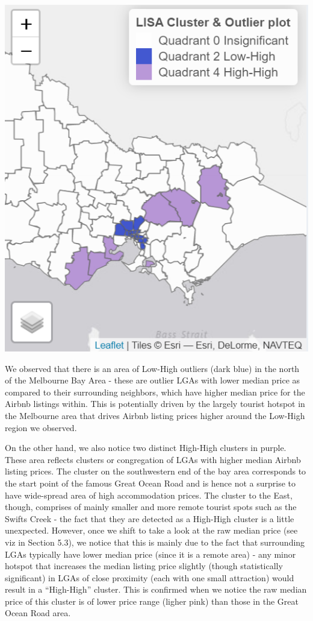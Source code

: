 \documentclass{acm_proc_article-sp}
\begin{document}
\includegraphics{images/geo3.png}

We observed that there is an area of Low-High outliers (dark blue) in
the north of the Melbourne Bay Area - these are outlier LGAs with lower
median price as compared to their surrounding neighbors, which have
higher median price for the Airbnb listings within. This is potentially
driven by the largely tourist hotspot in the Melbourne area that drives
Airbnb listing prices higher around the Low-High region we observed.

On the other hand, we also notice two distinct High-High clusters in
purple. These area reflects clusters or congregation of LGAs with higher
median Airbnb listing prices. The cluster on the southwestern end of the
bay area corresponds to the start point of the famous Great Ocean Road
and is hence not a surprise to have wide-spread area of high
accommodation prices. The cluster to the East, though, comprises of
mainly smaller and more remote tourist spots such as the Swifts Creek -
the fact that they are detected as a High-High cluster is a little
unexpected. However, once we shift to take a look at the raw median
price (see viz in Section 5.3), we notice that this is mainly due to the
fact that surrounding LGAs typically have lower median price (since it
is a remote area) - any minor hotspot that increases the median listing
price slightly (though statistically significant) in LGAs of close
proximity (each with one small attraction) would result in a
``High-High'' cluster. This is confirmed when we notice the raw median
price of this cluster is of lower price range (ligher pink) than those
in the Great Ocean Road area.
\end{document}
